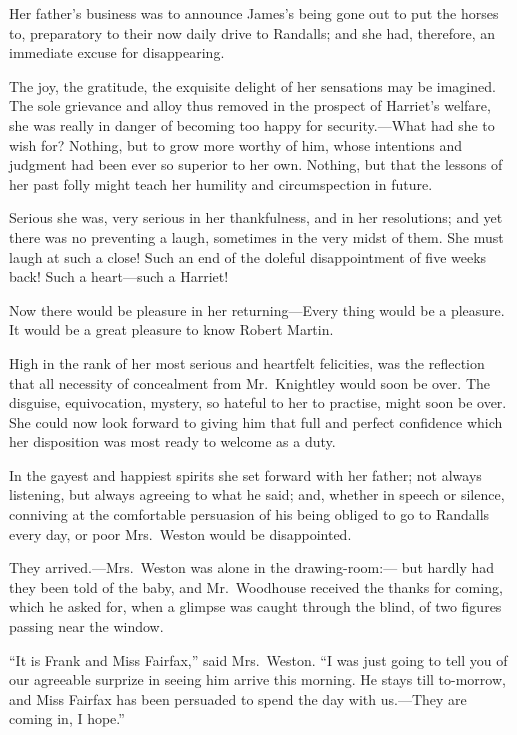 Her father's business was to announce James's being gone out to put
the horses to, preparatory to their now daily drive to Randalls;
and she had, therefore, an immediate excuse for disappearing.

The joy, the gratitude, the exquisite delight of her sensations
may be imagined.  The sole grievance and alloy thus removed in the
prospect of Harriet's welfare, she was really in danger of becoming
too happy for security.---What had she to wish for?  Nothing, but to
grow more worthy of him, whose intentions and judgment had been
ever so superior to her own.  Nothing, but that the lessons
of her past folly might teach her humility and circumspection in future.

Serious she was, very serious in her thankfulness, and in her resolutions;
and yet there was no preventing a laugh, sometimes in the very midst
of them.  She must laugh at such a close!  Such an end of the doleful
disappointment of five weeks back!  Such a heart---such a Harriet!

Now there would be pleasure in her returning---Every thing would
be a pleasure.  It would be a great pleasure to know Robert Martin.

High in the rank of her most serious and heartfelt felicities,
was the reflection that all necessity of concealment from
Mr.\ Knightley would soon be over.  The disguise, equivocation,
mystery, so hateful to her to practise, might soon be over.
She could now look forward to giving him that full and perfect
confidence which her disposition was most ready to welcome as a duty.

In the gayest and happiest spirits she set forward with her father;
not always listening, but always agreeing to what he said;
and, whether in speech or silence, conniving at the comfortable
persuasion of his being obliged to go to Randalls every day,
or poor Mrs.\ Weston would be disappointed.

They arrived.---Mrs.\ Weston was alone in the drawing-room:---%
but hardly had they been told of the baby, and Mr.\ Woodhouse
received the thanks for coming, which he asked for, when a glimpse
was caught through the blind, of two figures passing near the window.

``It is Frank and Miss Fairfax,'' said Mrs.\ Weston.  ``I was just
going to tell you of our agreeable surprize in seeing him arrive
this morning.  He stays till to-morrow, and Miss Fairfax has been
persuaded to spend the day with us.---They are coming in, I hope.''

